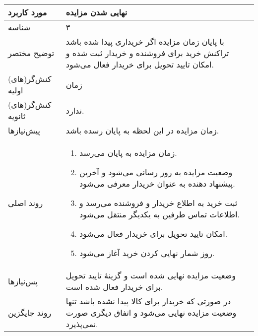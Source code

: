 \documentclass{article}
\begin{document}
\begin{center}
\bgroup
\def\arraystretch{1.5}
\begin{tabular} {|p{}|p{}|}
\hline
 مورد کاربرد & 
نهایی شدن مزایده
\\ \hline
 شناسه &
۳
\\ \hline
توضیح مختصر &
با پایان زمان مزایده اگر خریداری پیدا شده باشد تراکنش خرید برای فروشنده و خریدار ثبت شده و امکان تایید تحویل برای خریدار فعال می‌شود.
\\ \hline
کنش‌گر(های) اولیه &
زمان
\\ \hline
کنش‌گر(های) ثانویه &
ندارد.
\\ \hline
پیش‌نیازها &
زمان مزایده در این لحظه به پایان رسده باشد.
\\ \hline
روند اصلی &
\begin{enumerate}[nosep,topsep=0cm]
\item
زمان مزایده به پایان می‌رسد.
\item
وضعیت مزایده به روز رسانی می‌شود و آخرین پیشنهاد دهنده به عنوان خریدار معرفی می‌شود.
\item
ثبت خرید به اطلاع خریدار و فروشنده می‌رسد و اطلاعات تماس طرفین به یکدیگر منتقل می‌شود.
\item
امکان تایید تحویل برای خریدار فعال می‌شود.
\item
روز شمار نهایی کردن خرید آغاز می‌شود.
\end{enumerate}
\\ \hline
پس‌نیازها &
وضعیت مزایده نهایی شده است و گزینهٔ تایید تحویل برای خریدار فعال شده است.
\\ \hline
روند جایگزین &
در صورتی که خریدار برای کالا پیدا نشده باشد تنها وضعیت مزایده نهایی می‌شود و اتفاق دیگری صورت نمی‌پذیرد.
\\ \hline
\end{tabular}
\egroup
\end{center}

\newpage
\end{document}
